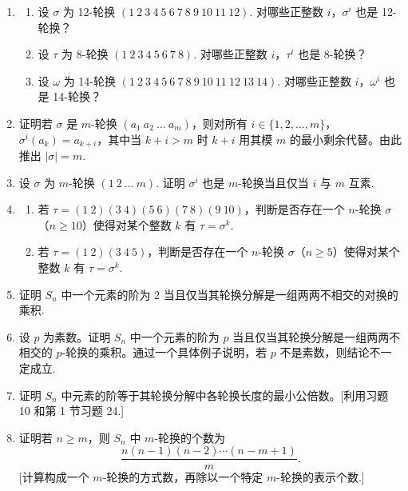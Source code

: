 \begin{enumerate}
\item \begin{enumerate}[label=(\alph*)]
\item 设 \( \sigma \) 为 12-轮换 \( (1 \ 2 \ 3 \ 4 \ 5 \ 6 \ 7 \ 8 \ 9 \ 10 \ 11 \ 12) \). 对哪些正整数 \( i \)，\( \sigma^i \) 也是 12-轮换？
\item 设 \( \tau \) 为 8-轮换 \( (1 \ 2 \ 3 \ 4 \ 5 \ 6 \ 7 \ 8) \). 对哪些正整数 \( i \)，\( \tau^i \) 也是 8-轮换？
\item 设 \( \omega \) 为 14-轮换 \( (1 \ 2 \ 3 \ 4 \ 5 \ 6 \ 7 \ 8 \ 9 \ 10 \ 11 \ 12 \ 13 \ 14) \). 对哪些正整数 \( i \)，\( \omega^i \) 也是 14-轮换？
\end{enumerate}

\item 证明若 \( \sigma \) 是 \( m \)-轮换 \( (a_1 \ a_2 \ \dots \ a_m) \)，则对所有 \( i \in \{1, 2, \dots, m\} \)，\( \sigma^i(a_k) = a_{k+i} \)，其中当 \( k+i > m \) 时 \( k+i \) 用其模 \( m \) 的最小剩余代替。由此推出 \( |\sigma| = m \).

\item 设 \( \sigma \) 为 \( m \)-轮换 \( (1 \ 2 \ \dots \ m) \). 证明 \( \sigma^i \) 也是 \( m \)-轮换当且仅当 \( i \) 与 \( m \) 互素.

\item \begin{enumerate}[label=(\alph*)]
\item 若 \( \tau = (1 \ 2)(3 \ 4)(5 \ 6)(7 \ 8)(9 \ 10) \)，判断是否存在一个 \( n \)-轮换 \( \sigma \)（\( n \geq 10 \)）使得对某个整数 \( k \) 有 \( \tau = \sigma^k \).
\item 若 \( \tau = (1 \ 2)(3 \ 4 \ 5) \)，判断是否存在一个 \( n \)-轮换 \( \sigma \)（\( n \geq 5 \)）使得对某个整数 \( k \) 有 \( \tau = \sigma^k \).
\end{enumerate}

\item 证明 \( S_n \) 中一个元素的阶为 2 当且仅当其轮换分解是一组两两不相交的对换的乘积.

\item 设 \( p \) 为素数。证明 \( S_n \) 中一个元素的阶为 \( p \) 当且仅当其轮换分解是一组两两不相交的 \( p \)-轮换的乘积。通过一个具体例子说明，若 \( p \) 不是素数，则结论不一定成立.

\item 证明 \( S_n \) 中元素的阶等于其轮换分解中各轮换长度的最小公倍数。[利用习题 10 和第 1 节习题 24.]

\item 证明若 \( n \geq m \)，则 \( S_n \) 中 \( m \)-轮换的个数为
\[
\frac{n(n-1)(n-2)\cdots(n-m+1)}{m}.
\]
[计算构成一个 \( m \)-轮换的方式数，再除以一个特定 \( m \)-轮换的表示个数.]


\end{enumerate}
